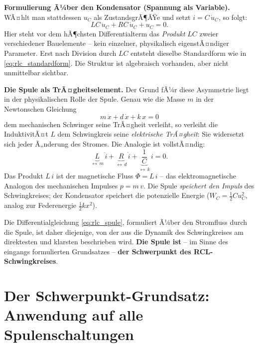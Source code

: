 ﻿\documentclass[12pt, a4paper]{article}
\begin{document}
	\textbf{Formulierung Ã¼ber den Kondensator (Spannung als Variable).}
	WÃ¤hlt man stattdessen $u_C$ als ZustandsgrÃ¶ÃŸe und setzt $i = C\,\dot{u}_C$, so folgt:
	\begin{equation}
		LC\,\ddot{u}_C + RC\,\dot{u}_C + u_C = 0.
		\label{eq:rlc_kondensator}
	\end{equation}
	Hier steht vor dem hÃ¶chsten Differentialterm das \textit{Produkt} $LC$ zweier verschiedener Bauelemente -- kein einzelner, physikalisch eigenstÃ¤ndiger Parameter. Erst nach Division durch $LC$ entsteht dieselbe Standardform wie in \eqref{eq:rlc_standardform}. Die Struktur ist algebraisch vorhanden, aber nicht unmittelbar sichtbar.

	\textbf{Die Spule als TrÃ¤gheitselement.}
	Der Grund fÃ¼r diese Asymmetrie liegt in der physikalischen Rolle der Spule. Genau wie die Masse $m$ in der Newtonschen Gleichung
	\begin{equation}
		m\,\ddot{x} + d\,\dot{x} + k\,x = 0
	\end{equation}
	dem mechanischen Schwinger seine TrÃ¤gheit verleiht, so verleiht die InduktivitÃ¤t $L$ dem Schwingkreis seine \textit{elektrische TrÃ¤gheit}: Sie widersetzt sich jeder Ã„nderung des Stromes. Die Analogie ist vollstÃ¤ndig:
	\begin{equation}
		\underbrace{L}_{\displaystyle\leftrightarrow\, m}\,\ddot{i}
		+ \underbrace{R}_{\displaystyle\leftrightarrow\, d}\,\dot{i}
		+ \underbrace{\frac{1}{C}}_{\displaystyle\leftrightarrow\, k}\,i = 0.
	\end{equation}
	Das Produkt $L\,i$ ist der magnetische Fluss $\Phi = L\,i$ -- das elektromagnetische Analogon des mechanischen Impulses $p = m\,v$. Die Spule \textit{speichert den Impuls} des Schwingkreises; der Kondensator speichert die potenzielle Energie ($W_C = \frac{1}{2}Cu_C^2$, analog zur Federenergie $\frac{1}{2}kx^2$).

	Die Differentialgleichung \eqref{eq:rlc_spule}, formuliert Ã¼ber den Stromfluss durch die Spule, ist daher diejenige, von der aus die Dynamik des Schwingkreises am direktesten und klarsten beschrieben wird. \textbf{Die Spule ist} -- im Sinne des eingangs formulierten Grundsatzes -- \textbf{der Schwerpunkt des RCL-Schwingkreises}.
	
	
	\section{Der Schwerpunkt-Grundsatz: Anwendung auf alle Spulenschaltungen}
	\label{sec:schwerpunkt_spule_allgemein}
	
\end{document}
